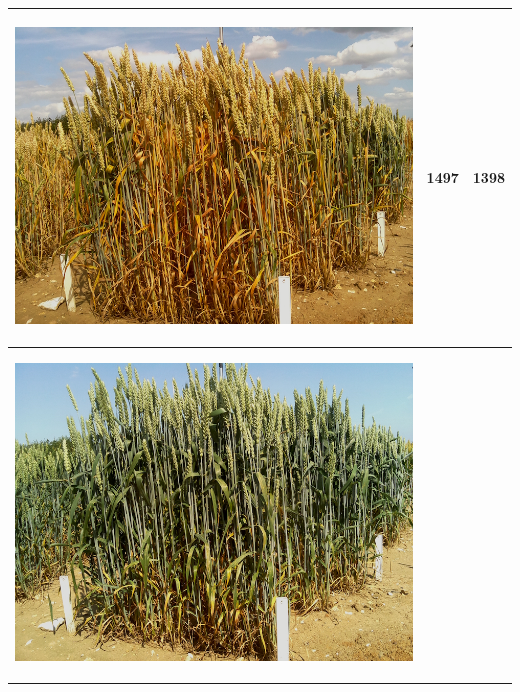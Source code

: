 \begin{table}[ht!]
\begin{tabular}{ | c | c | c | }
    \\ \hline
    \begin{minipage}{.3\textwidth}
      \begin{center}
		\includegraphics[width=\linewidth]{Images/009}
      \end{center}
    \end{minipage}
    &
      1497
    & 
      1398
    \\ \hline
    \begin{minipage}{.3\textwidth}
      \begin{center}
		\includegraphics[width=\linewidth]{Images/010}

\end{center}
\end{minipage}
\end{tabular}
\end{table}
